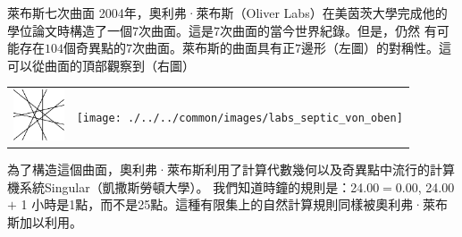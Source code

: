 \begin{surferPage}[萊布斯七次曲面]{萊布斯七次曲面}
2004年，奧利弗·萊布斯（Oliver Labs）在美茵茨大學完成他的學位論文時構造了一個$7$次曲面。這是$7$次曲面的當今世界紀錄。但是，仍然
有可能存在$104$個奇異點的$7$次曲面。萊布斯的曲面具有正$7$邊形（左圖）的對稱性。這可以從曲面的頂部觀察到（右圖）

    \vspace*{-0.3em}
    \begin{center}
      \begin{tabular}{c@{\qquad}c}
        \includegraphics[height=1.5cm]{./../../common/images/labsseptic1.pdf}
        &
        \texttt{[image: ./../../common/images/labs\_septic\_von\_oben]}
      \end{tabular}
    \end{center}
    \vspace*{-0.3em}

為了構造這個曲面，奧利弗·萊布斯利用了計算代數幾何以及奇異點中流行的計算機系統{\sc Singular}（凱撒斯勞頓大學）。
我們知道時鐘的規則是：24.00$=$0.00, 24.00 $+$ 1 小時是1點，而不是25點。這種有限集上的自然計算規則同樣被奧利弗·萊布斯加以利用。
\end{surferPage}
